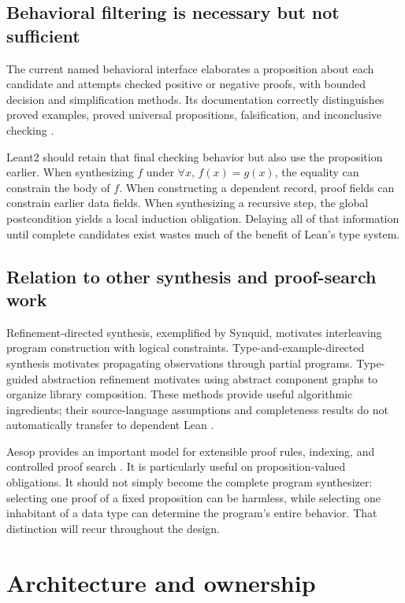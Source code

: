 \documentclass[11pt,letterpaper]{article}
\theoremstyle{definition}
\theoremstyle{remark}
\begin{document}
\subsection{Behavioral filtering is necessary but not sufficient}

The current named behavioral interface elaborates a proposition about each candidate and attempts checked positive or negative proofs, with bounded decision and simplification methods. Its documentation correctly distinguishes proved examples, proved universal propositions, falsification, and inconclusive checking \cite{behavior}.

Leant2 should retain that final checking behavior but also use the proposition earlier. When synthesizing $f$ under $\forall x,\,f(x)=g(x)$, the equality can constrain the body of $f$. When constructing a dependent record, proof fields can constrain earlier data fields. When synthesizing a recursive step, the global postcondition yields a local induction obligation. Delaying all of that information until complete candidates exist wastes much of the benefit of Lean's type system.

\subsection{Relation to other synthesis and proof-search work}

Refinement-directed synthesis, exemplified by Synquid, motivates interleaving program construction with logical constraints. Type-and-example-directed synthesis motivates propagating observations through partial programs. Type-guided abstraction refinement motivates using abstract component graphs to organize library composition. These methods provide useful algorithmic ingredients; their source-language assumptions and completeness results do not automatically transfer to dependent Lean \cite{synquid,myth,tygar}.

Aesop provides an important model for extensible proof rules, indexing, and controlled proof search \cite{aesop}. It is particularly useful on proposition-valued obligations. It should not simply become the complete program synthesizer: selecting one proof of a fixed proposition can be harmless, while selecting one inhabitant of a data type can determine the program's entire behavior. That distinction will recur throughout the design.

\section{Architecture and ownership}
\label{sec:architecture}
\end{document}
